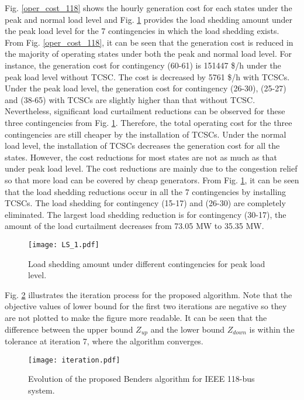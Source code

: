 \documentclass[journal]{IEEEtran}
\begin{document}
Fig. \ref{oper_cost_118} shows the hourly generation cost for each states under the peak and normal load level and Fig. \ref{LS} provides the load shedding amount under the peak load level for the 7 contingencies in which the load shedding exists. From Fig. \ref{oper_cost_118}, it can be seen that the generation cost is reduced in the majority of operating states under both the peak and normal load level. For instance, the generation cost for contingency (60-61) is 151447 \$/h under the peak load level without TCSC. The cost is decreased by 5761 \$/h with TCSCs. Under the peak load level, the generation cost for contingency (26-30), (25-27) and (38-65) with TCSCs are slightly higher than that without TCSC. Nevertheless, significant load curtailment reductions can be observed for these three contingencies from Fig. \ref{LS}. Therefore, the total operating cost for the three contingencies are still cheaper by the installation of TCSCs. Under the normal load level, the installation of TCSCs decreases the generation cost for all the states. However, the cost reductions for most states are not as much as that under peak load level. The cost reductions are mainly due to the congestion relief so that more load can be covered by cheap generators. From Fig. \ref{LS}, it can be seen that the load shedding reductions occur in all the 7 contingencies by installing TCSCs. The load shedding for contingency (15-17) and (26-30) are completely eliminated. The largest load shedding reduction is for contingency (30-17), the amount of the load curtailment decreases from 73.05 MW to 35.35 MW. 

\begin{figure}[!htb]
	\centering
	\texttt{[image: LS\_1.pdf]}
	\caption{Load shedding amount under different contingencies for peak load level.}
	\label{LS}
\end{figure}

Fig. \ref{iteration} illustrates the iteration process for the proposed algorithm. Note that the objective values of lower bound for the first two iterations are negative so they are not plotted to make the figure more readable. It can be seen that the difference between the upper bound $Z_{up}$ and the lower bound $Z_{down}$ is within the tolerance at iteration 7, where the algorithm converges.  

\begin{figure}[!htb]
	\centering
	\texttt{[image: iteration.pdf]}
	\caption{Evolution of the proposed Benders algorithm for IEEE 118-bus system.}
	\label{iteration}
\end{figure}
\end{document}
